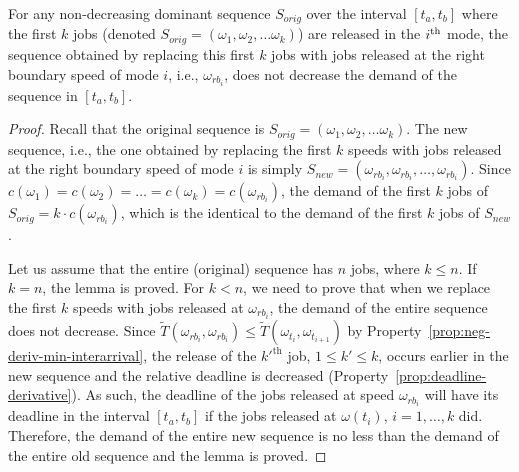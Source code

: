 \begin{lemma}\label{lemma:startSpeed}
For any non-decreasing dominant sequence $S_{orig}$ over the interval $[t_a, t_b]$ where the first $k$ jobs (denoted $S_{orig} = (\omega_1,\omega_2, \ldots \omega_k)$) are released in the $i^{\rm th}$ mode, the sequence obtained by replacing this first $k$ jobs with jobs released at the right boundary speed of mode $i$, i.e., $\omega_{rb_i}$, does not decrease the demand of the sequence in $[t_a, t_b]$.
\end{lemma}
\begin{proof}
Recall that the original sequence is $S_{\mathit{orig}} = (\omega_1,\omega_2, \ldots \omega_k)$. The new sequence, i.e., the one obtained by replacing the first $k$ speeds with jobs released at the right boundary speed of mode $i$ is simply $S_{\mathit{new}} = (\omega_{rb_i},\omega_{rb_i}, \ldots, \omega_{rb_i})$. Since $c(\omega_1) = c(\omega_2) = \ldots = c(\omega_k) = c(\omega_{rb_i})$, the demand 
of the first $k$ jobs of $S_{\mathit{orig}} = k \cdot c(\omega_{rb_i})$, which is the identical to the demand of the first $k$ jobs of $S_{\mathit{new}}$.

Let us assume that the entire (original) sequence has $n$ jobs, where $k \leq n$. If $k = n$, the lemma is proved. For $k < n$, we need to prove that when we replace the first $k$ speeds with jobs released at $\omega_{rb_i}$, the demand of the entire sequence does not decrease. Since $\widetilde{T}(\omega_{rb_i},\omega_{rb_i}) \leq \widetilde{T}(\omega_{t_i},\omega_{t_{i+1}})$ by Property~\ref{prop:neg-deriv-min-interarrival}, the release of the $k'^{\mathrm{th}}$ job, $1 \leq k' \leq k$, occurs earlier in the new sequence and the relative deadline is decreased (Property~\ref{prop:deadline-derivative}). As such, the deadline of the jobs released at speed $\omega_{rb_i}$ will have its deadline in the interval $[t_a, t_b]$ if the jobs released at $\omega(t_i)$, $i = 1, \ldots, k$ did. Therefore, the demand of the entire new sequence is no less than the demand of the entire old sequence and the lemma is proved.
\end{proof}


